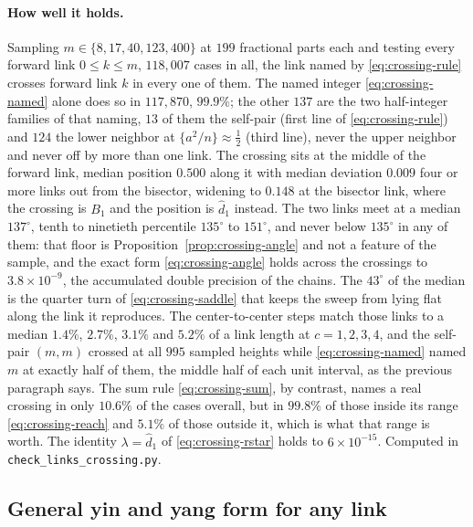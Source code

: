 \documentclass[11pt]{article}
\theoremstyle{definition}
\begin{document}
\paragraph{How well it holds.} Sampling $m\in\{8,17,40,123,400\}$ at $199$
fractional parts each and testing every forward link $0\leq k\leq m$,
$118{,}007$ cases in all, the link named by \eqref{eq:crossing-rule} crosses
forward link $k$ in every one of them. The named integer
\eqref{eq:crossing-named} alone does so in $117{,}870$, $99.9\%$; the other
$137$ are the two half-integer families of that naming, $13$ of them the
self-pair (first line of \eqref{eq:crossing-rule}) and $124$ the lower
neighbor at $\{a^{2}/n\}\approx\tfrac12$ (third line), never the upper
neighbor and never off by more than one link. The
crossing sits at the middle of the forward link, median position $0.500$ along
it with median deviation $0.009$ four or more links out from the bisector, widening
to $0.148$ at the bisector link, where the crossing is $B_1$ and the position is
$\hat d_1$ instead. The two links meet at a median $137^{\circ}$, tenth to
ninetieth percentile $135^{\circ}$ to $151^{\circ}$, and never below
$135^{\circ}$ in any of them: that floor is
Proposition~\ref{prop:crossing-angle} and not a feature of the sample, and the
exact form \eqref{eq:crossing-angle} holds across the crossings to
$3.8\times10^{-9}$, the accumulated double precision of the chains. The
$43^{\circ}$ of the median is the quarter turn of \eqref{eq:crossing-saddle}
that keeps the sweep from lying flat along the link it reproduces. The center-to-center steps
match those links to a median $1.4\%$, $2.7\%$, $3.1\%$ and $5.2\%$ of a link
length at $c=1,2,3,4$, and the self-pair $(m,m)$ crossed at all $995$ sampled
heights while \eqref{eq:crossing-named} named $m$ at exactly half of them, the
middle half of each unit interval, as the previous paragraph says. The sum rule
\eqref{eq:crossing-sum}, by contrast, names a real crossing in only $10.6\%$ of
the cases overall, but in $99.8\%$ of those inside its range
\eqref{eq:crossing-reach} and $5.1\%$ of those outside it, which is what that
range is worth. The identity $\lambda=\hat d_1$ of \eqref{eq:crossing-rstar}
holds to $6\times10^{-15}$. Computed in \texttt{check\_links\_crossing.py}.

\subsection{General yin and yang form for any link}\label{sec:yinyang-any}
\end{document}

